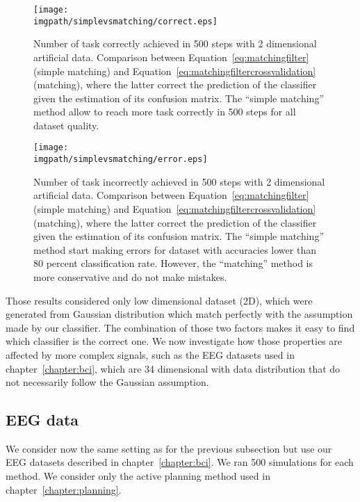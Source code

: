 \begin{figure}[!ht]
\centering
\texttt{[image: \\imgpath/simplevsmatching/correct.eps]}
\caption{Number of task correctly achieved in 500 steps with 2 dimensional artificial data. Comparison between Equation~\ref{eq:matchingfilter} (simple matching) and Equation~\ref{eq:matchingfiltercrossvalidation} (matching), where the latter correct the prediction of the classifier given the estimation of its confusion matrix. The ``simple matching'' method allow to reach more task correctly in 500 steps for all dataset quality.
}
\label{fig:nCorrect_simplevsmatching}
\end{figure} 

\begin{figure}[!ht]
\centering
\texttt{[image: \\imgpath/simplevsmatching/error.eps]}
\caption{Number of task incorrectly achieved in 500 steps with 2 dimensional artificial data. Comparison between Equation~\ref{eq:matchingfilter} (simple matching) and Equation~\ref{eq:matchingfiltercrossvalidation} (matching), where the latter correct the prediction of the classifier given the estimation of its confusion matrix. The ``simple matching'' method start making errors for dataset with accuracies lower than 80 percent classification rate. However, the ``matching'' method is more conservative and do not make mistakes.}
\label{fig:nWrongEEG_simplevsmatching}
\end{figure} 

\transition

Those results considered only low dimensional dataset (2D), which were generated from Gaussian distribution which match perfectly with the assumption made by our classifier. The combination of those two factors makes it easy to find which classifier is the correct one. We now investigate how those properties are affected by more complex signals, such as the EEG datasets used in chapter~\ref{chapter:bci}, which are 34 dimensional with data distribution that do not necessarily follow the Gaussian assumption.

\subsection{EEG data}

We consider now the same setting as for the previous subsection but use our EEG datasets described in chapter~\ref{chapter:bci}. We ran 500 simulations for each method. We consider only the active planning method used in chapter~\ref{chapter:planning}.

